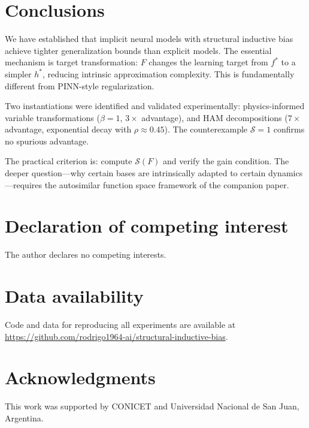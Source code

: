 \documentclass[12pt]{article}
\begin{document}
\section{Conclusions}
\label{sec:conclusions}

We have established that implicit neural models with structural
inductive bias achieve tighter generalization bounds than explicit
models.
The essential mechanism is target transformation: $F$ changes the
learning target from $f^*$ to a simpler $h^*$, reducing intrinsic
approximation complexity.
This is fundamentally different from PINN-style regularization.

Two instantiations were identified and validated experimentally:
physics-informed variable transformations ($\beta = 1$, $3\times$
advantage), and HAM decompositions ($7\times$ advantage,
exponential decay with $\rho \approx 0.45$).
The counterexample $\mathcal{S} = 1$ confirms no spurious advantage.

The practical criterion is: compute $\mathcal{S}(F)$ and verify
the gain condition.
The deeper question---why certain bases are intrinsically adapted to
certain dynamics---requires the autosimilar function space framework
of the companion paper.

\section*{Declaration of competing interest}
The author declares no competing interests.

\section*{Data availability}
Code and data for reproducing all experiments are available at
\url{https://github.com/rodrigo1964-ai/structural-inductive-bias}.

\section*{Acknowledgments}
This work was supported by CONICET and Universidad Nacional de San
Juan, Argentina.
\end{document}
